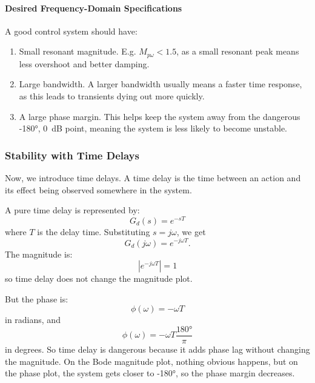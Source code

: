 \paragraph{Desired Frequency-Domain Specifications}
A good control system should have:
\begin{enumerate}
  \item Small resonant magnitude. E.g. $M_{p\omega} < \num{1,5}$, as a small resonant peak means less overshoot and better damping.
  \item Large bandwidth.
    A larger bandwidth usually means a faster time response, as this leads to transients dying out more quickly.
  \item A large phase margin.
    This helps keep the system away from the dangerous \ang{-180}, \qty{0}{\dB} point, meaning the system is less likely to become unstable.
\end{enumerate}

\subsubsection{Stability with Time Delays}
Now, we introduce time delays.
A time delay is the time between an action and its effect being observed somewhere in the system.

A pure time delay is represented by:
\begin{equation*}
  G_d(s) = e^{-sT}
\end{equation*}
where $T$ is the delay time.
Substituting $s = j\omega$, we get
\begin{equation*}
  G_d(j\omega) = e^{-j\omega T}
.\end{equation*}
The magnitude is:
\begin{equation*}
  \left| e^{-j\omega T} \right| = 1
\end{equation*}
so time delay does not change the magnitude plot.

But the phase is:
\begin{equation*}
  \phi(\omega) = -\omega T
\end{equation*}
in radians, and
\begin{equation*}
  \phi(\omega) = -\omega T \frac{\ang{180} }{\pi}
\end{equation*}
in degrees.
So time delay is dangerous because it adds phase lag without changing the magnitude.
On the Bode magnitude plot, nothing obvious happens, but on the phase plot, the system gets closer to \ang{-180}, so the phase margin decreases.
